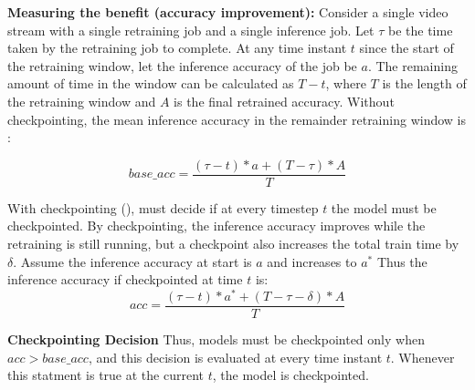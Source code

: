\textbf{Measuring the benefit (accuracy improvement): } Consider a single video stream with a single retraining job and a single inference job. Let $\tau$ be the time taken by the retraining job to complete. At any time instant $t$ since the start of the retraining window, let the inference accuracy of the job be $a$. The remaining amount of time in the window can be calculated as $T-t$, where $T$ is the length of the retraining window and $A$ is the final retrained accuracy. Without checkpointing, the mean inference accuracy in the remainder retraining window is :

\[
    base\_acc = \frac{(\tau-t)*a + (T-\tau)*A}{T} 
\]

With checkpointing (), \name{} must decide if at every timestep $t$ the model must be checkpointed. By checkpointing, the inference accuracy improves while the retraining is still running, but a checkpoint also increases the total train time by $\delta$. Assume the inference accuracy at start is $a$ and increases to $a^{*}$ Thus the inference accuracy if checkpointed at time $t$ is:  
\[
    acc = \frac{(\tau-t)*a^{*} + (T-\tau-\delta)*A}{T} 
\]

\textbf{Checkpointing Decision} Thus, models must be checkpointed only when $acc > base\_acc$, and this decision is evaluated at every time instant $t$. Whenever this statment is true at the current $t$, the model is checkpointed.
